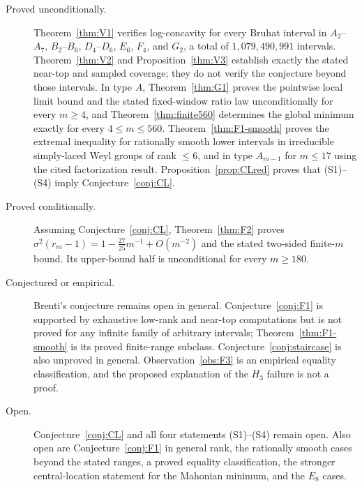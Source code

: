 \documentclass[11pt]{amsart}
\theoremstyle{plain}
\theoremstyle{definition}
\theoremstyle{remark}
\begin{document}
\begin{description}
\item[Proved unconditionally.] Theorem~\ref{thm:V1} verifies
log-concavity for every Bruhat interval in
$A_2$--$A_7$, $B_2$--$B_6$, $D_4$--$D_6$, $E_6$, $F_4$, and $G_2$, a
total of $1{,}079{,}490{,}991$ intervals. Theorem~\ref{thm:V2} and
Proposition~\ref{thm:V3} establish exactly the stated near-top and sampled
coverage; they do not verify the conjecture beyond those intervals. In
type $A$, Theorem~\ref{thm:G1} proves the pointwise local limit bound and
the stated fixed-window ratio law unconditionally for every $m\ge4$, and
Theorem~\ref{thm:finite560} determines the global minimum exactly for every
$4\le m\le560$. Theorem~\ref{thm:F1-smooth} proves the extremal inequality
for rationally smooth lower intervals in irreducible simply-laced Weyl
groups of rank $\le6$, and in type $A_{m-1}$ for $m\le17$ using the cited
factorization result. Proposition~\ref{prop:CLred} proves that (S1)--(S4)
imply Conjecture~\ref{conj:CL}.

\item[Proved conditionally.] Assuming Conjecture~\ref{conj:CL},
Theorem~\ref{thm:F2} proves
$\sigma^2(r_m-1)=1-\tfrac{27}{25}m^{-1}+O(m^{-2})$ and the stated
two-sided finite-$m$ bound. Its upper-bound half is unconditional for every
$m\ge180$.

\item[Conjectured or empirical.] Brenti's conjecture remains open in
general. Conjecture~\ref{conj:F1} is supported by exhaustive low-rank and
near-top computations but is not proved for any infinite family of
arbitrary intervals; Theorem~\ref{thm:F1-smooth} is its proved finite-range
subclass. Conjecture~\ref{conj:staircase} is also unproved in general.
Observation~\ref{obs:F3} is an empirical equality classification, and the
proposed explanation of the $H_3$ failure is not a proof.

\item[Open.] Conjecture~\ref{conj:CL} and all four statements (S1)--(S4)
remain open. Also open are Conjecture~\ref{conj:F1} in general rank, the
rationally smooth cases beyond the stated ranges, a proved equality
classification, the stronger central-location statement for the Mahonian
minimum, and the $E_8$ cases.
\end{description}
\end{document}

